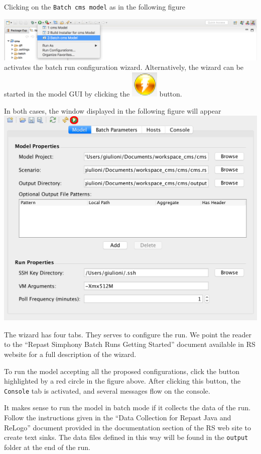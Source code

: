 \documentclass{article}
\begin{document}
Clicking on the \verb+Batch cms model+ as in the following figure

\vskip2mm
\noindent
\includegraphics[scale=0.35]{fig_cms_rs_batch1}
\vskip2mm
\noindent
activates the batch run configuration wizard. Alternatively, the wizard can be started in the model GUI by clicking the \includegraphics[scale=0.35]{fig_cms_rs_batch2} button.

In both cases, the window displayed in the following figure will appear 
\vskip2mm
\noindent
\includegraphics[scale=0.35]{fig_cms_rs_batch3}
\vskip2mm

The wizard has four tabs. They serves to configure the run. We point the reader to the ``Repast Simphony Batch Runs Getting Started'' document available in RS website for a full description of the wizard.

To run the model accepting all the proposed configurations, click the button highlighted by a red circle in the figure above. After clicking this button, the \verb+Console+ tab is activated, and several messages flow on the console. 

It makes sense to run the model in batch mode if it collects the data of the run. Follow the instructions given in the ``Data Collection for Repast Java and ReLogo'' document provided in the documentation section of the RS web site to create text sinks.   
The data files defined in this way will be found in the \verb+output+ folder at the end of the run.
\end{document}
